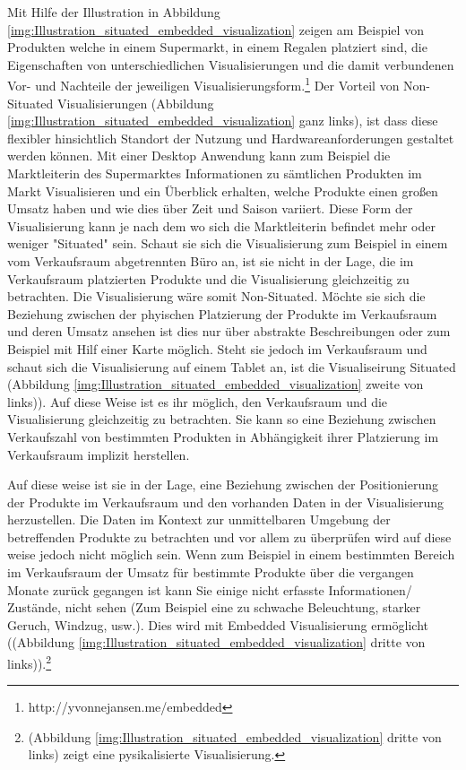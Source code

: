 Mit Hilfe der Illustration in Abbildung \ref{img:Illustration_situated_embedded_visualization} zeigen \cite{WesleyWillettYvonneJansen} am Beispiel von Produkten welche in einem Supermarkt, in einem Regalen platziert sind, die Eigenschaften von unterschiedlichen Visualisierungen und die damit verbundenen Vor- und Nachteile der jeweiligen Visualisierungsform.\footnote{http://yvonnejansen.me/embedded} Der Vorteil von Non-Situated Visualisierungen (Abbildung \ref{img:Illustration_situated_embedded_visualization} ganz links), ist dass diese flexibler hinsichtlich Standort der Nutzung und Hardwareanforderungen gestaltet werden können. Mit einer Desktop Anwendung kann zum Beispiel die Marktleiterin des Supermarktes Informationen zu sämtlichen Produkten im Markt Visualisieren und ein Überblick erhalten, welche Produkte einen großen Umsatz haben und wie dies über Zeit und Saison variiert. Diese Form der Visualisierung kann je nach dem wo sich die Marktleiterin befindet mehr oder weniger "Situated" sein. Schaut sie sich die Visualisierung zum Beispiel in einem vom Verkaufsraum abgetrennten Büro an, ist sie nicht in der Lage, die im Verkaufsraum platzierten Produkte und die Visualisierung gleichzeitig zu betrachten. Die Visualisierung wäre somit Non-Situated. Möchte sie sich die Beziehung zwischen der phyischen Platzierung der Produkte im Verkaufsraum und deren Umsatz ansehen ist dies nur über abstrakte Beschreibungen oder zum Beispiel mit Hilf einer Karte möglich. Steht sie jedoch im Verkaufsraum und schaut sich die Visualisierung auf einem Tablet an, ist die Visualiseirung Situated (Abbildung \ref{img:Illustration_situated_embedded_visualization} zweite von links)). Auf diese Weise ist es ihr möglich, den Verkaufsraum und die Visualisierung gleichzeitig zu betrachten. Sie kann so eine Beziehung zwischen Verkaufszahl von bestimmten Produkten in Abhängigkeit ihrer Platzierung im Verkaufsraum implizit herstellen.

Auf diese weise ist sie in der Lage, eine Beziehung zwischen der Positionierung der Produkte im Verkaufsraum und den vorhanden Daten in der Visualisierung herzustellen. Die Daten im Kontext zur unmittelbaren Umgebung 
der betreffenden Produkte zu betrachten und vor allem zu überprüfen wird auf diese weise jedoch nicht möglich sein. Wenn zum Beispiel in einem bestimmten Bereich im Verkaufsraum der Umsatz für bestimmte Produkte 
über die vergangen Monate zurück gegangen ist kann Sie einige nicht erfasste Informationen/ Zustände, nicht sehen (Zum Beispiel eine zu schwache Beleuchtung, starker Geruch, Windzug, usw.). Dies wird mit Embedded 
Visualisierung ermöglicht ((Abbildung \ref{img:Illustration_situated_embedded_visualization} dritte von links)).\footnote{(Abbildung \ref{img:Illustration_situated_embedded_visualization} dritte von links) zeigt eine pysikalisierte Visualisierung.}   

